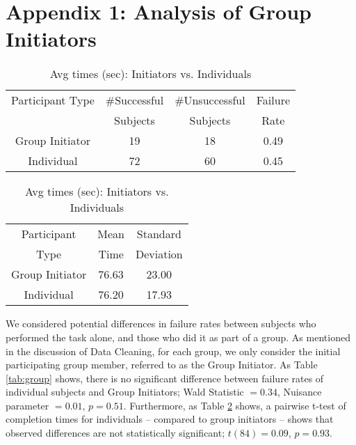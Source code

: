 \documentclass{llncs}
\begin{document}
\appendix
\section*{Appendix 1: Analysis of Group Initiators}
\label{app:Init}

\begin{table}[h]
\parbox{.45\textwidth}{
%
\small
\centering 
\caption{{\scriptsize Failure Rates: Initiators vs. Individuals}}
\label{tab:group}
{\setlength{\extrarowheight}{10pt}
\begin{tabular}{||c|c|c|c||}
\hline \cline{1-4}
Participant Type &  \#Successful & \#Unsuccessful  & Failure \vspace*{-0.3cm} \\
			 &  Subjects       & Subjects              & Rate
\\ \hline \cline{1-4}
Group Initiator	& 19	& 18	& 0.49
\\  \hline
Individual &	       72&	60	& 0.45
\\ \hline \cline{1-4}
\end{tabular}}
}
\hfill
\parbox{.45\textwidth}{
\small
\centering 
\caption{\scriptsize Avg times (sec): Initiators vs. Individuals}
\label{tab:grouptimes}

{\setlength{\extrarowheight}{10pt}
\begin{tabular}{||c|c|c||}
\hline \cline{1-3}
Participant  & Mean  & Standard \vspace*{-0.3cm}\\
  Type & Time    & Deviation 
\\ \hline \cline{1-3}
Group Initiator & 76.63 & 23.00
\\ \hline
Individual & 76.20 & 17.93
\\ \hline \cline{1-3}
\end{tabular}}
}
\end{table}	

We considered potential differences in failure rates between subjects 
who performed the task alone, and those who did it as part of a group. 
As mentioned in the discussion of Data Cleaning, for each group, 
we only consider the initial participating group member, referred to as the Group Initiator. 
As Table \ref{tab:group} shows, there is no significant difference between failure rates of 
individual subjects and Group Initiators; Wald Statistic $= 0.34$, 
Nuisance parameter $= 0.01$, $p = 0.51$. Furthermore, as Table \ref{tab:grouptimes} shows, 
a pairwise t-test of completion times for individuals -- compared to group initiators -- 
shows that observed differences are not statistically significant; $t(84)=0.09$, $p = 0.93$.
\end{document}
